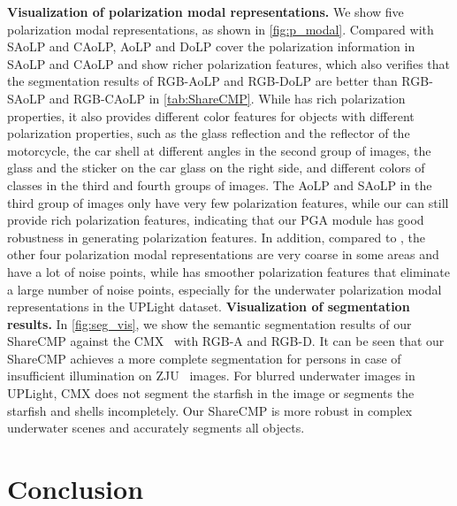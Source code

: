 \documentclass[10pt,twocolumn,letterpaper]{article}
\begin{document}
\noindent
\textbf{Visualization of polarization modal representations.}
We show five polarization modal representations, as shown in \cref{fig:p_modal}. Compared with SAoLP and CAoLP, AoLP and DoLP cover the polarization information in SAoLP and CAoLP and show richer polarization features, which also verifies that the segmentation results of RGB-AoLP and RGB-DoLP are better than RGB-SAoLP and RGB-CAoLP in \cref{tab:ShareCMP}. While  has rich polarization properties, it also provides different color features for objects with different polarization properties, such as the glass reflection and the reflector of the motorcycle, the car shell at different angles in the second group of images, the glass and the sticker on the car glass on the right side, and different colors of classes in the third and fourth groups of images. The AoLP and SAoLP in the third group of images only have very few polarization features, while our  can still provide rich polarization features, indicating that our PGA module has good robustness in generating polarization features. In addition, compared to , the other four polarization modal representations are very coarse in some areas and have a lot of noise points, while  has smoother polarization features that eliminate a large number of noise points, especially for the underwater polarization modal representations in the UPLight dataset.
\newline
\noindent
\textbf{Visualization of segmentation results.}
In \cref{fig:seg_vis}, we show the semantic segmentation results of our ShareCMP against the CMX~\cite{cmx} with RGB-A and RGB-D. It can be seen that our ShareCMP achieves a more complete segmentation for persons in case of insufficient illumination on ZJU~\cite{zju} images. For blurred underwater images in UPLight, CMX does not segment the starfish in the image or segments the starfish and shells incompletely. Our ShareCMP is more robust in complex underwater scenes and accurately segments all objects. \section{Conclusion}
\label{sec:conclusion}
\end{document}
